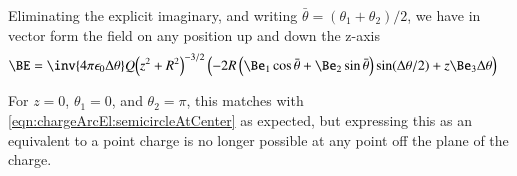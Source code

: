 Eliminating the explicit imaginary, and writing $\bar{\theta} = (\theta_1 + \theta_2)/2$, we have in vector form
the field on any position up and down the z-axis
\begin{align}
\BE 
&= \inv{4 \pi \epsilon_0 \Delta\theta} Q { \left(z^2 + R^2\right) }^{-3/2}
\left(
-2 R \left( \Be_1 \cos \bar\theta +\Be_2 \sin\bar\theta \right) \sin(\Delta\theta/2)
+ z \Be_3 \Delta\theta \right) 
\end{align}

For $z = 0$, $\theta_1 = 0$, and $\theta_2 = \pi$, this matches with \ref{eqn:chargeArcEl:semicircleAtCenter} as expected, but
expressing this as an equivalent to a point charge is no longer possible at any point off the plane of the
charge.
